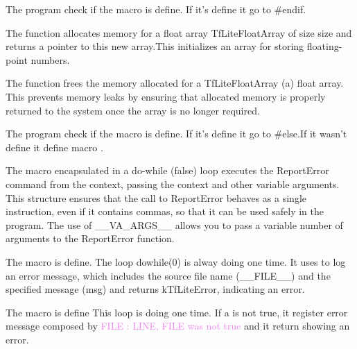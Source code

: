 The program check if the macro  is define. If it's define it go to \#endif. 

The function  allocates memory for a float array TfLiteFloatArray of size size and returns a pointer to this new array.This initializes an array for storing floating-point numbers.

The function  frees the memory allocated for a TfLiteFloatArray (a) float array. This prevents memory leaks by ensuring that allocated memory is properly returned to the system once the array is no longer required.

\begin{center}
    \label{Figure:Comatibily}
\end{center}

The program check if the macro  is define. If it's define it go to \#else.If it wasn't define it define macro  .

The macro encapsulated in a do-while (false) loop executes the ReportError command from the context, passing the context and other variable arguments. This structure ensures that the call to ReportError behaves as a single instruction, even if it contains commas, so that it can be used safely in the program.  The use of \_\_VA\_ARGS\_\_ allows you to pass a variable number of arguments to the ReportError function.


The macro  is define. The loop do{}while(0) is alway doing one time. It uses  to log an error message, which includes the source file name (\_\_FILE\_\_) and the specified message (msg) and returns kTfLiteError, indicating an error. 

\begin{center}
    \label{Figure:Comatibily}
\end{center}


The macro  is define 
This loop is doing one time. If a is not true, it register error message composed by \textcolor{violet}{FILE : LINE, FILE was not true} and it return showing an error. 

